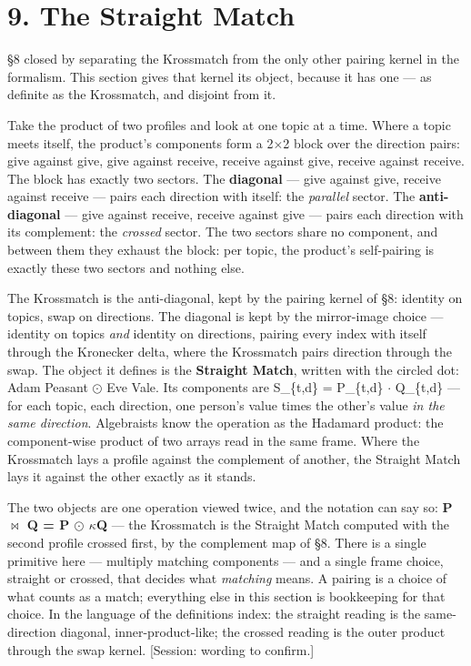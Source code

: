 \section{9. The Straight Match}\label{the-straight-match}

\S 8 closed by separating the Krossmatch from the only other pairing
kernel in the formalism. This section gives that kernel its object,
because it has one --- as definite as the Krossmatch, and disjoint from
it.

Take the product of two profiles and look at one topic at a time. Where
a topic meets itself, the product's components form a 2$\times$2 block over the
direction pairs: give against give, give against receive, receive
against give, receive against receive. The block has exactly two
sectors. The \textbf{diagonal} --- give against give, receive against
receive --- pairs each direction with itself: the \emph{parallel}
sector. The \textbf{anti-diagonal} --- give against receive, receive
against give --- pairs each direction with its complement: the
\emph{crossed} sector. The two sectors share no component, and between
them they exhaust the block: per topic, the product's self-pairing is
exactly these two sectors and nothing else.

The Krossmatch is the anti-diagonal, kept by the pairing kernel of \S 8:
identity on topics, swap on directions. The diagonal is kept by the
mirror-image choice --- identity on topics \emph{and} identity on
directions, pairing every index with itself through the Kronecker delta,
where the Krossmatch pairs direction through the swap. The object it
defines is the \textbf{Straight Match}, written with the circled dot:
Adam Peasant $\odot$ Eve Vale. Its components are S\_\{t,d\} = P\_\{t,d\} $\cdot$
Q\_\{t,d\} --- for each topic, each direction, one person's value times
the other's value \emph{in the same direction}. Algebraists know the
operation as the Hadamard product: the component-wise product of two
arrays read in the same frame. Where the Krossmatch lays a profile
against the complement of another, the Straight Match lays it against
the other exactly as it stands.

The two objects are one operation viewed twice, and the notation can say
so: \textbf{P $\bowtie$ Q = P $\odot$ $\kappa$Q} --- the Krossmatch is the Straight Match
computed with the second profile crossed first, by the complement map of
\S 8. There is a single primitive here --- multiply matching components
--- and a single frame choice, straight or crossed, that decides what
\emph{matching} means. A pairing is a choice of what counts as a match;
everything else in this section is bookkeeping for that choice. In the
language of the definitions index: the straight reading is the
same-direction diagonal, inner-product-like; the crossed reading is the
outer product through the swap kernel. {[}Session: wording to
confirm.{]}

